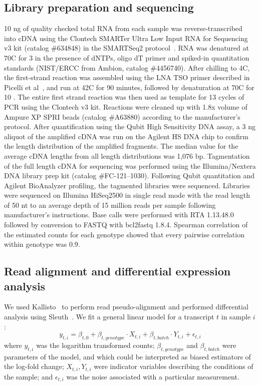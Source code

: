 \documentclass[9pt,twocolumn,twoside]{pnas-new}
\begin{document}
{\subsection*{Library preparation and sequencing}
10 \si{\nano\gram} of quality checked total RNA from each sample was
reverse-transcribed into cDNA using the Clontech SMARTer Ultra Low Input RNA for
Sequencing v3 kit (catalog \#634848) in the SMARTSeq2
protocol~\cite{Picelli2014}.  RNA was denatured at 70\degree{}C for 3 \si{\min}
in the presence of dNTPs, oligo dT primer and spiked-in quantitation standards
(NIST/ERCC from Ambion, catalog \#4456740).  After chilling to 4\degree{}C, the
first-strand reaction was assembled using the LNA TSO primer described in
Picelli et al~\cite{Picelli2014}, and run at 42\degree{}C for 90 minutes,
followed by denaturation at 70\degree{}C for 10 \si{\min}.  The entire first
strand reaction was then used as template for 13 cycles of PCR using the
Clontech v3 kit. Reactions were cleaned up with 1.8x volume of Ampure XP SPRI
beads (catalog \#A63880) according to the manufacturer’s protocol.  After
quantification using the Qubit High Sensitivity DNA assay, a 3 \si{\nano\gram}
aliquot of the amplified cDNA was run on the Agilent HS DNA chip to confirm the
length distribution of the amplified fragments.  The median value for the
average cDNA lengths from all length distributions was 1,076 bp.  Tagmentation
of the full length cDNA for sequencing was performed using the Illumina/Nextera
DNA library prep kit (catalog \#FC-121--1030). Following Qubit quantitation and
Agilent BioAnalyzer profiling, the tagmented libraries were sequenced. Libraries
were sequenced on Illumina HiSeq2500 in single read mode with the read length of
50 nt to an average depth of 15 million reads per sample following
manufacturer's instructions. Base calls were performed with RTA 1.13.48.0
followed by conversion to FASTQ with bcl2fastq 1.8.4. Spearman correlation of
the estimated counts for each genotype showed that every pairwise correlation
within genotype was $0.9$.

\subsection*{Read alignment and differential expression analysis} We used
Kallisto~\cite{Bray2016} to perform read pseudo-alignment and performed
differential analysis using Sleuth~\cite{Pimentel2016}. We fit a general linear
model for a transcript $t$ in sample $i$:
\begin{equation}
  y_{t,i} = \beta_{t, 0} + \beta_{t, genotype}\cdot{}X_{t, i} +
  \beta_{t, batch}\cdot{}Y_{t, i} + \epsilon_{t, i}
\end{equation}
where $y_{t, i}$ was the logarithm transformed counts; $\beta_{t, genotype}$ and
$\beta_{t, batch}$ were parameters of the model, and which could be interpreted
as biased estimators of the log-fold change; $X_{t, i}, Y_{t, i}$ were indicator
variables describing the conditions of the sample; and $\epsilon_{t, i}$ was the
noise associated with a particular measurement.

}
\end{document}
